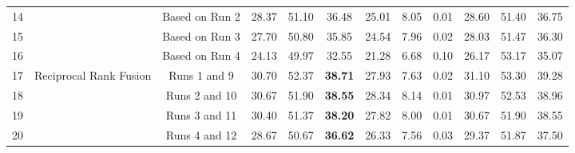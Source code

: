 \begin{table}
\begin{tabular}{c|c|c|ccc|cc|c|ccc}
14 &  & Based on Run 2 & 28.37 & 51.10 & 36.48 & 25.01 & 8.05 & 0.01 & 28.60 & 51.40 & 36.75\tabularnewline
15 &  & Based on Run 3  & 27.70 & 50.80 & 35.85 & 24.54 & 7.96 & 0.02 & 28.03 & 51.47 & 36.30\tabularnewline
16 &  & Based on Run 4 & 24.13 & 49.97 & 32.55 & 21.28 & 6.68 & 0.10 & 26.17 & 53.17 & 35.07\tabularnewline
\midrule
17 & \multirow{4}{*}{Reciprocal Rank Fusion} & Runs 1 and 9 & 30.70 & 52.37 & \textbf{38.71} & 27.93 & 7.63 & 0.02 & 31.10 & 53.30 & 39.28\tabularnewline
18 &  & Runs 2 and 10 & 30.67 & 51.90 & \textbf{38.55} & 28.34 & 8.14 & 0.01 & 30.97 & 52.53 & 38.96\tabularnewline
19 &  & Runs 3 and 11 & 30.40 & 51.37 & \textbf{38.20} & 27.82 & 8.00 & 0.01 & 30.67 & 51.90 & 38.55\tabularnewline
20 &  & Runs 4 and 12 & 28.67 & 50.67 & \textbf{36.62} & 26.33 & 7.56 & 0.03 & 29.37 & 51.87 & 37.50\tabularnewline
\bottomrule
\end{tabular}
\end{table}

